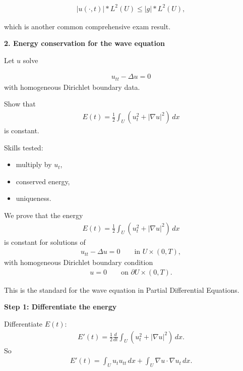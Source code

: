 \documentclass[12pt,a4paper]{report}
\begin{document}
\begin{description}
\begin{align*}
|u(\cdot,t)|*{L^2(U)}\le |g|*{L^2(U)},
\end{align*}

which is another common comprehensive exam result.


\newpage\item \textbf{2. Energy conservation for the wave equation}

Let $u$ solve

\begin{align*}
u_{tt}-\Delta u=0
\end{align*}
with homogeneous Dirichlet boundary data.

Show that
\begin{align*}
E(t)=\frac12\int_U(u_t^2+|\nabla u|^2)\,dx
\end{align*}
is constant.

Skills tested:

	\begin{itemize}
    \item multiply by $u_t$,
    \item conserved energy,
    \item uniqueness.
	\end{itemize}

\HLINE


We prove that the energy
\begin{align*}
E(t)=\frac12\int_U\left(u_t^2+|\nabla u|^2\right)\,dx
\end{align*}
is constant for solutions of
\begin{align*}
u_{tt}-\Delta u=0
\qquad\text{in }U\times(0,T),
\end{align*}
with homogeneous Dirichlet boundary condition
\begin{align*}
u=0 \qquad\text{on }\partial U\times(0,T).
\end{align*}

This is the standard  for the wave equation in Partial Differential Equations.
\begin{description}

\item \textbf{Step 1: Differentiate the energy}

Differentiate $E(t)$:
\begin{align*}
E'(t) = \frac12\frac{d}{dt}\int_U\left(u_t^2+|\nabla u|^2\right)\,dx.
\end{align*}
So
\begin{align*}
E'(t) = \int_U u_tu_{tt}\,dx + \int_U \nabla u\cdot\nabla u_t\,dx.
\end{align*}


\end{description}
\end{description}
\end{document}
